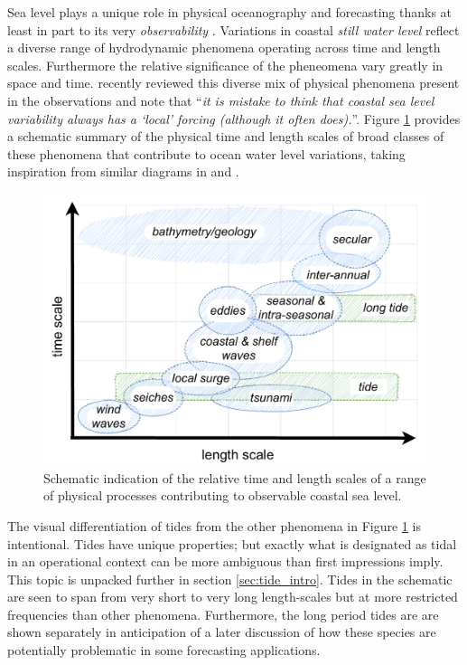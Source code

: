 Sea level plays a unique role in physical oceanography and forecasting thanks at least in part to its very \emph{observability} \citep{Wilson:2010hy}. 
Variations in coastal \emph{still water level} \citep{Pugh:2014di} reflect a diverse range of hydrodynamic phenomena operating across time and length scales.   Furthermore the relative significance of the pheneomena vary greatly in space and time.
\citet{10.1007/s10712-019-09531-1} recently reviewed this diverse mix of physical phenomena present in the observations and note that ``\textit{it is mistake to think that coastal sea level variability always has a ‘local’ forcing (although it often does).}''. 
Figure \ref{fig:sealevelScales} provides a schematic summary of the physical time and length scales of broad classes of these phenomena that contribute to ocean water level variations, taking inspiration from similar diagrams in \citet{10.1007/s10712-019-09531-1} and \citet{Chelton:2001ws}.
\begin{figure}[H]\centering
  \includegraphics[width=\figwidthFull]{figures/diagrams/scales_time_length.pdf}
  \caption{Schematic indication of the relative time and length scales of a range of physical processes contributing to observable coastal sea level.}
  \label{fig:sealevelScales}
\end{figure}
The visual differentiation of tides from the other phenomena in Figure \ref{fig:sealevelScales} is intentional.  Tides have unique properties; but exactly what is designated as tidal in an operational context can be more ambiguous than first impressions imply. This topic is unpacked further in section \ref{sec:tide_intro}. Tides in the schematic are seen to span from very short to very long length-scales but at more restricted frequencies than other phenomena.    Furthermore, the long period tides are are shown separately in anticipation of a later discussion of how these species are potentially problematic in some forecasting applications.

